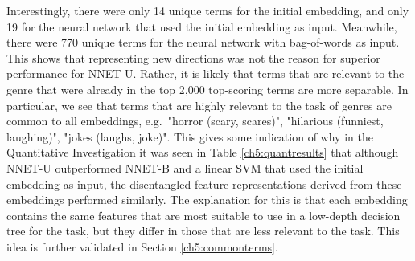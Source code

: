 Interestingly, there were only 14 unique terms for the initial embedding, and only 19 for the neural network that used the initial embedding as input. Meanwhile, there were 770 unique terms for the neural network with bag-of-words as input. This shows that representing new directions was not the reason for superior performance for NNET-U. Rather, it is likely that terms that are relevant to the genre that were already in the top 2,000 top-scoring terms are more separable. In particular, we see that terms that are highly relevant to the task of genres are common to all embeddings, e.g.\ "horror (scary, scares)", "hilarious (funniest, laughing)", "jokes (laughs, joke)". This gives some indication of why in the Quantitative Investigation it was seen in Table \ref{ch5:quantresults} that although NNET-U outperformed NNET-B and a linear SVM that used the initial embedding as input, the disentangled feature representations derived from these embeddings performed similarly. The explanation for this is that each embedding contains the same features that are most suitable to use in a low-depth decision tree for the task, but they differ in those that are less relevant to the task. This idea is further validated in Section \ref{ch5:commonterms}.


